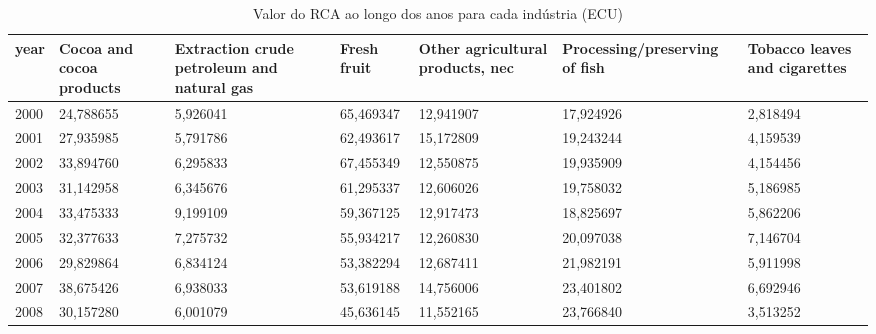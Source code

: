 \begin{table}
\centering
\caption{Valor do RCA ao longo dos anos para cada indústria (ECU)}
\begin{tabular}{p{1cm}p{2cm}p{2cm}p{2cm}p{2cm}p{2cm}p{2cm}}
\toprule
 year &  Cocoa and cocoa products &  Extraction crude petroleum and natural gas &  Fresh fruit &  Other agricultural products, nec &  Processing/preserving of fish &  Tobacco leaves and cigarettes \\
\midrule
 2000 &                 24,788655 &                                    5,926041 &    65,469347 &                         12,941907 &                      17,924926 &                       2,818494 \\
 2001 &                 27,935985 &                                    5,791786 &    62,493617 &                         15,172809 &                      19,243244 &                       4,159539 \\
 2002 &                 33,894760 &                                    6,295833 &    67,455349 &                         12,550875 &                      19,935909 &                       4,154456 \\
 2003 &                 31,142958 &                                    6,345676 &    61,295337 &                         12,606026 &                      19,758032 &                       5,186985 \\
 2004 &                 33,475333 &                                    9,199109 &    59,367125 &                         12,917473 &                      18,825697 &                       5,862206 \\
 2005 &                 32,377633 &                                    7,275732 &    55,934217 &                         12,260830 &                      20,097038 &                       7,146704 \\
 2006 &                 29,829864 &                                    6,834124 &    53,382294 &                         12,687411 &                      21,982191 &                       5,911998 \\
 2007 &                 38,675426 &                                    6,938033 &    53,619188 &                         14,756006 &                      23,401802 &                       6,692946 \\
 2008 &                 30,157280 &                                    6,001079 &    45,636145 &                         11,552165 &                      23,766840 &                       3,513252 \\

\end{tabular}
\end{table}
